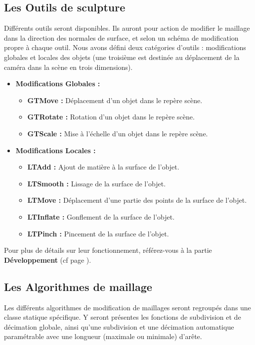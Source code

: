\documentclass[a4paper]{memoir}
\begin{document}
			\subsection{Les Outils de sculpture}
				\label{tool-cdc}
				Différents outils seront disponibles. Ils auront pour action de modifier le maillage dans la direction des normales de surface, et selon
				un schéma de modification propre à chaque outil. Nous avons défini deux catégories d'outils : modifications globales et locales des objets
				(une troisième est destinée au déplacement de la caméra dans la scène en trois dimensions).
				\newpage
				\begin{itemize}
					\item \textbf{Modifications Globales :}
					\begin{itemize}
						\item \textbf{GTMove :} Déplacement d'un objet dans le repère scène.
						\item \textbf{GTRotate :} Rotation d'un objet dans le repère scène.
						\item \textbf{GTScale :} Mise à l'échelle d'un objet dans le repère scène.
					\end{itemize}
					\item \textbf{Modifications Locales :}
					\begin{itemize}
						\item \textbf{LTAdd :} Ajout de matière à la surface de l'objet.
						\item \textbf{LTSmooth :} Lissage de la surface de l'objet.
						\item \textbf{LTMove :} Déplacement d'une partie des points de la surface de l'objet.
						\item \textbf{LTInflate :} Gonflement de la surface de l'objet.
						\item \textbf{LTPinch :} Pincement de la surface de l'objet.
					\end{itemize}
				\end{itemize}
				Pour plus de détails sur leur fonctionnement, référez-vous à la partie \textbf{Développement} (cf page \pageref{tool-dev}).

			\subsection{Les Algorithmes de maillage}
				Les différents algorithmes de modification de maillages seront regroupés dans une classe statique spécifique. Y seront présentes les 
				fonctions de subdivision et de décimation globale, ainsi qu'une subdivision et une décimation automatique paramétrable avec une longueur 
				(maximale ou minimale) d'arête.
\end{document}
